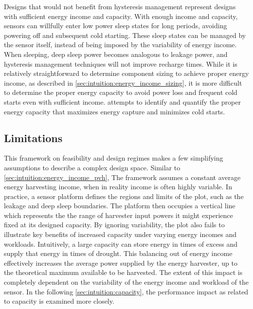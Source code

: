 Designs that would not benefit from hysteresis management represent designs with sufficient energy income and capacity.
With enough income and capacity, sensors can willfully enter low power sleep states for long periods, avoiding powering off and subsequent cold starting.
These sleep states can be managed by the sensor itself, instead of being imposed by the variability of energy income.
When sleeping, deep sleep power becomes analogous to leakage power, and hysteresis management techniques will not improve recharge times.
While it is relatively straightforward to determine component sizing to achieve proper energy income, as described in \cref{sec:intuition:energy_income_sizing}, it is more difficult to determine the proper energy capacity to avoid power loss and frequent cold starts even with sufficient income.  attempts to identify and quantify the proper energy capacity that maximizes energy capture and minimizes cold starts.




\subsection{Limitations}
\label{sec:intuition:framework_limitations}
This framework on feasibility and design regimes makes a few simplifying assumptions to describe a complex design space.
Similar to \cref{sec:intuition:energy_income_pvh}, The framework assumes a constant average energy
harvesting income, when in reality income is often highly variable. 
In practice, a sensor
platform defines the regions and limits of the plot, such as the leakage and deep sleep boundaries.
The platform then occupies a
vertical line which represents the 
the range of harvester input powers it might experience fixed at its designed capacity. 
By ignoring variability, the plot also fails to illustrate key benefits
of increased capacity under varying energy incomes and workloads. 
Intuitively,
a large capacity can store energy in times of excess and supply
that energy in times of drought. This balancing out of energy income
effectively increases the average power supplied by the energy harvester, up to the theoretical maximum available to be harvested.
The extent of this impact is completely dependent on the variability
of the energy income and workload of the sensor. 
In the following \cref{sec:intuition:capacity}, the performance impact as related to capacity is examined more closely. 

